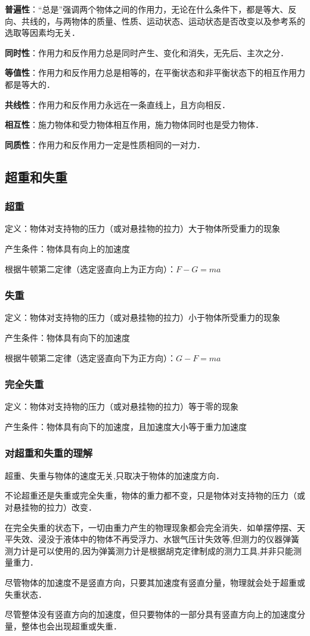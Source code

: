 \textbf{普遍性}：“总是”强调两个物体之间的作用力，无论在什么条件下，都是等大、反向、共线的，与两物体的质量、性质、运动状态、运动状态是否改变以及参考系的选取等因素均无关．

\textbf{同时性}：作用力和反作用力总是同时产生、变化和消失，无先后、主次之分．

\textbf{等值性}：作用力和反作用力总是相等的，在平衡状态和非平衡状态下的相互作用力都是等大的．

\textbf{共线性}：作用力和反作用力永远在一条直线上，且方向相反．

\textbf{相互性}：施力物体和受力物体相互作用，施力物体同时也是受力物体．

\textbf{同质性}：作用力和反作用力一定是性质相同的一对力．

\subsection{超重和失重}

\subsubsection{超重}

定义：物体对支持物的压力（或对悬挂物的拉力）大于物体所受重力的现象

产生条件：物体具有向上的加速度

根据牛顿第二定律（选定竖直向上为正方向）：$F-G=ma$

\subsubsection{失重}

定义：物体对支持物的压力（或对悬挂物的拉力）小于物体所受重力的现象

产生条件：物体具有向下的加速度

根据牛顿第二定律（选定竖直向下为正方向）：$G-F=ma$

\subsubsection{完全失重}

定义：物体对支持物的压力（或对悬挂物的拉力）等于零的现象

产生条件：物体具有向下的加速度，且加速度大小等于重力加速度

\subsubsection{对超重和失重的理解}

超重、失重与物体的速度无关,只取决于物体的加速度方向．

不论超重还是失重或完全失重，物体的重力都不变，只是物体对支持物的压力（或对悬挂物的拉力）改变．

在完全失重的状态下，一切由重力产生的物理现象都会完全消失．如单摆停摆、天平失效、浸没于液体中的物体不再受浮力、水银气压计失效等,但测力的仪器弹簧测力计是可以使用的,因为弹簧测力计是根据胡克定律制成的测力工具,并非只能测量重力．

尽管物体的加速度不是竖直方向，只要其加速度有竖直分量，物理就会处于超重或失重状态．

尽管整体没有竖直方向的加速度，但只要物体的一部分具有竖直方向上的加速度分量，整体也会出现超重或失重．
